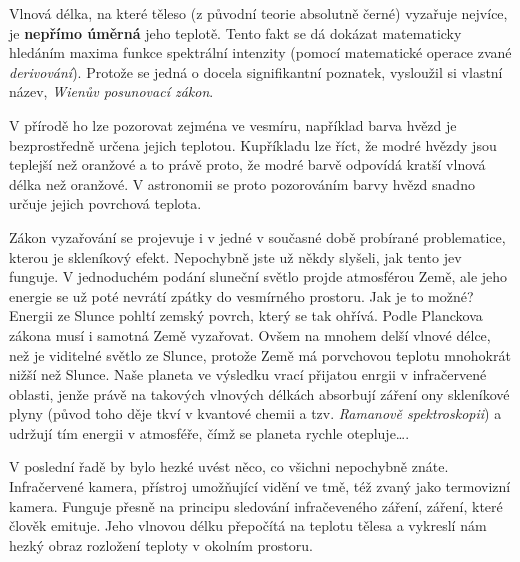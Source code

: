 \documentclass{../../../../style/mkimain}
\begin{document}
\noindent{}
\proborigin{}
\klein

Vlnová délka, na které těleso (z původní teorie absolutně černé) vyzařuje nejvíce, je \textbf{nepřímo úměrná} jeho teplotě.
Tento fakt se dá dokázat matematicky hledáním maxima funkce spektrální intenzity (pomocí matematické operace zvané \emph{derivování}).
Protože se jedná o docela signifikantní poznatek, vysloužil si vlastní název, \emph{Wienův posunovací zákon}.

V přírodě ho lze pozorovat zejména ve vesmíru, například barva hvězd je bezprostředně určena jejich teplotou.
Kupříkladu lze říct, že modré hvězdy jsou teplejší než oranžové a to právě proto, že modré barvě odpovídá kratší vlnová délka než oranžové.
V astronomii se proto pozorováním barvy hvězd snadno určuje jejich povrchová teplota.

Zákon vyzařování se projevuje i v jedné v současné době probírané problematice, kterou je skleníkový efekt.
Nepochybně jste už někdy slyšeli, jak tento jev funguje. V jednoduchém podání sluneční světlo projde atmosférou Země,
ale jeho energie se už poté nevrátí zpátky do vesmírného prostoru. Jak je to možné? Energii ze Slunce pohltí zemský povrch, který se tak ohřívá.
Podle Planckova zákona musí i samotná Země vyzařovat. Ovšem na mnohem delší vlnové délce, než je viditelné světlo ze Slunce,
protože Země má porvchovou teplotu mnohokrát nižší než Slunce. Naše planeta ve výsledku vrací přijatou enrgii v infračervené oblasti,
jenže právě na takových vlnových délkách absorbují záření ony skleníkové plyny
(původ toho děje tkví v kvantové chemii a tzv. \emph{Ramanově spektroskopii}) a udržují tím energii v atmosféře,
čímž se planeta rychle otepluje\dots.

V poslední řadě by bylo hezké uvést něco, co všichni nepochybně znáte. Infračervené kamera, přístroj umožňující vidění ve tmě,
též zvaný jako termovizní kamera. Funguje přesně na principu sledování infračeveného záření, záření, které člověk emituje.
Jeho vlnovou délku přepočítá na teplotu tělesa a vykreslí nám hezký obraz rozložení teploty v okolním prostoru.
\end{document}
